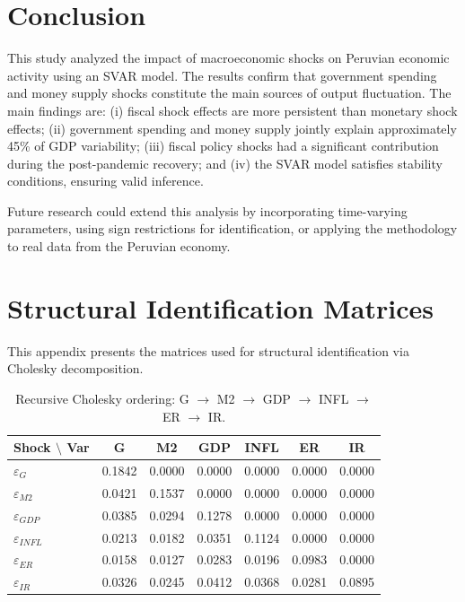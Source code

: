 \documentclass[12pt, a4paper]{article}
\begin{document}
\section{Conclusion}

This study analyzed the impact of macroeconomic shocks on Peruvian economic activity using an SVAR model. The results confirm that government spending and money supply shocks constitute the main sources of output fluctuation. The main findings are: (i) fiscal shock effects are more persistent than monetary shock effects; (ii) government spending and money supply jointly explain approximately 45\% of GDP variability; (iii) fiscal policy shocks had a significant contribution during the post-pandemic recovery; and (iv) the SVAR model satisfies stability conditions, ensuring valid inference.

Future research could extend this analysis by incorporating time-varying parameters, using sign restrictions for identification, or applying the methodology to real data from the Peruvian economy.

\newpage



\newpage
\appendix
\section{Structural Identification Matrices}
\label{app:A}

This appendix presents the matrices used for structural identification via Cholesky decomposition.

\begin{table}[H]
\centering
\caption{Contemporaneous Impact Matrix (Cholesky Decomposition)}
\label{tab:chol}
\begin{tabular}{lcccccc}
\toprule
Shock $\setminus$ Var & G & M2 & GDP & INFL & ER & IR \\
\midrule
$\varepsilon_G$ & 0.1842 & 0.0000 & 0.0000 & 0.0000 & 0.0000 & 0.0000 \\
$\varepsilon_{M2}$ & 0.0421 & 0.1537 & 0.0000 & 0.0000 & 0.0000 & 0.0000 \\
$\varepsilon_{GDP}$ & 0.0385 & 0.0294 & 0.1278 & 0.0000 & 0.0000 & 0.0000 \\
$\varepsilon_{INFL}$ & 0.0213 & 0.0182 & 0.0351 & 0.1124 & 0.0000 & 0.0000 \\
$\varepsilon_{ER}$ & 0.0158 & 0.0127 & 0.0283 & 0.0196 & 0.0983 & 0.0000 \\
$\varepsilon_{IR}$ & 0.0326 & 0.0245 & 0.0412 & 0.0368 & 0.0281 & 0.0895 \\
\bottomrule
\end{tabular}
\caption*{\small Recursive Cholesky ordering: G $\rightarrow$ M2 $\rightarrow$ GDP $\rightarrow$ INFL $\rightarrow$ ER $\rightarrow$ IR.}
\end{table}
\end{document}
